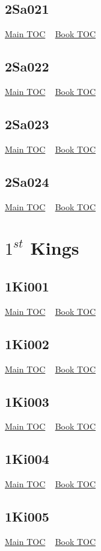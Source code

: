 \documentclass{book}
\begin{document}
  \section{2Sa021}\hyperlink{toc}{Main TOC} ~ \hyperref[subsec:2Sa]{Book TOC} 
  \section{2Sa022}\hyperlink{toc}{Main TOC} ~ \hyperref[subsec:2Sa]{Book TOC} 
  \section{2Sa023}\hyperlink{toc}{Main TOC} ~ \hyperref[subsec:2Sa]{Book TOC} 
  \section{2Sa024}\hyperlink{toc}{Main TOC} ~ \hyperref[subsec:2Sa]{Book TOC} 
  \chapter{$1^{st}$ Kings} \label{subsec:1Ki} \begin{multicols}{2} \minitoc \end{multicols}
  \section{1Ki001}\hyperlink{toc}{Main TOC} ~ \hyperref[subsec:1Ki]{Book TOC} 
  \section{1Ki002}\hyperlink{toc}{Main TOC} ~ \hyperref[subsec:1Ki]{Book TOC} 
  \section{1Ki003}\hyperlink{toc}{Main TOC} ~ \hyperref[subsec:1Ki]{Book TOC} 
  \section{1Ki004}\hyperlink{toc}{Main TOC} ~ \hyperref[subsec:1Ki]{Book TOC} 
  \section{1Ki005}\hyperlink{toc}{Main TOC} ~ \hyperref[subsec:1Ki]{Book TOC} 
\end{document}
